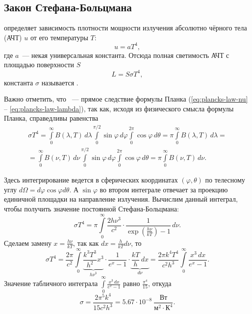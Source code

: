 \subsection{Закон Стефана-Больцмана}
 определяет зависимость плотности мощности излучения абсолютно чёрного тела (АЧТ) $u$ от его температуры $T$:
\begin{equation}
	u = a T^4,
\end{equation}
где $a$~--- некая универсальная константа.
Отсюда полная светимость АЧТ с площадью поверхности $S$
\begin{equation}
	L = S \sigma T^4,
	\label{eq:steff-bol-law}
\end{equation}
константа $\sigma$ называется .

Важно отметить, что ~--- прямое следствие формулы Планка (\ref{eq:plancks-law-nu} -- \ref{eq:plancks-law-lambda}), так как, исходя из физического смысла формулы Планка, справедливы равенства
\begin{multline}
	\sigma T^4 = \int\limits^\infty_0 B(\lambda, T)\,d\lambda \int\limits_0^{\pi/2} \sin \varphi\, d\varphi \int\limits_0^{2\pi} \cos \varphi\, d\theta = \pi \int\limits^\infty_0 B(\lambda, T)\,d\lambda =\\
	= \int\limits^\infty_0 B(\nu, T)\,d\nu \int\limits_0^{\pi/2} \sin \varphi\, d\varphi \int\limits_0^{2\pi} \cos \varphi\, d\theta = \pi \int\limits^\infty_0 B(\nu, T)\,d\nu.
\end{multline}

Здесь интегрирование ведется в сферических координатах $(\varphi, \theta)$ по телесному углу $d\Omega = d\varphi \cos \varphi d\theta$. А $\sin \varphi$ во втором интеграле отвечает за проекцию единичной площадки на направление излучения. Вычислим данный интеграл, чтобы получить значение постоянной Стефана-Больцмана:
\begin{equation*}
	\sigma T^4 = \pi \int\limits_0^{\infty} \frac{2h\nu^3}{c^2}\cdot \frac{1}{\exp\left(\frac{h\nu}{kT}\right)-1} \,d\nu.
\end{equation*}
Сделаем замену $x = \frac{h \nu}{k T}$, так как $dx = \frac{h}{k T} d\nu$, то
\begin{equation*}
	\sigma T^4 = \frac{2\pi}{c^2}  \int\limits_0^{\infty} \underbrace{\frac{k^3 T^3}{h^2} x^3}_{h\nu^3} \cdot \frac{1}{e^x - 1} \cdot \underbrace{\frac{kT}{h} \,dx}_{d\nu} = \frac{2 \pi k^4 T^4}{c^2 h^3} \int\limits_0^{\infty} \frac{x^3 \, dx}{e^x - 1}.
\end{equation*}
Значение табличного интеграла $\int\limits_0^{\infty} \frac{x^3 \, dx}{e^x - 1}$ равно $\frac{\pi^4}{15}$, откуда
\begin{equation*}
	\sigma = \frac{2 \pi^5 k^4}{15 c^2 h^3} = 5.67 \cdot 10^{-8}~\frac{\text{Вт}}{\text{м}^2 \cdot \text{К}^4}.
\end{equation*}

